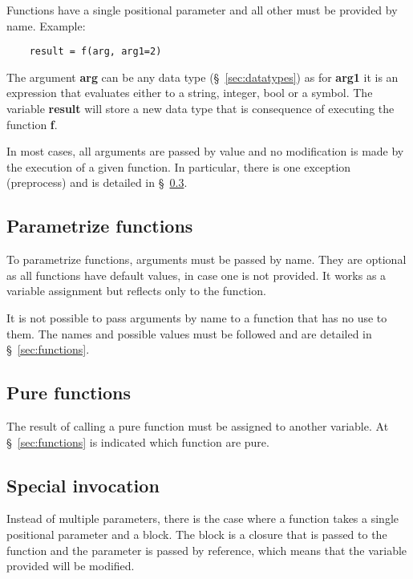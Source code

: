 \documentclass{article}
\begin{document}
Functions have a single positional parameter and all other must be provided by name. Example:

\begin{verbatim}
    result = f(arg, arg1=2)
\end{verbatim}

The argument \textbf{arg} can be any data type (§~\ref{sec:datatypes}) as for \textbf{arg1} it is an expression that evaluates either to a string, integer, bool or a symbol. The variable \textbf{result} will store a new data type that is consequence of executing the function \textbf{f}.

In most cases, all arguments are passed by value and no modification is made by the execution of a given function. In particular, there is one exception (pre\-process) and is detailed in §~\ref{sec:specin}.

\subsection{Parametrize functions}
\label{sec:optargs}

To parametrize functions, arguments must be passed by name. They are optional as all functions have default values, in case one is not provided. It works as a variable assignment but reflects only to the function. 

It is not possible to pass arguments by name to a function that has no use to them. The names and possible values must be followed and are detailed in §~\ref{sec:functions}.

\subsection{Pure functions}
\label{sec:purefunctions}

The result of calling a pure function must be assigned to another variable. At §~\ref{sec:functions} is indicated which function are pure.

\subsection{Special invocation}
\label{sec:specin}

Instead of multiple parameters, there is the case where a function takes a single positional parameter and a block. The block is a closure that is passed to the function and the parameter is passed by reference, which means that the variable provided will be modified. 
\end{document}
